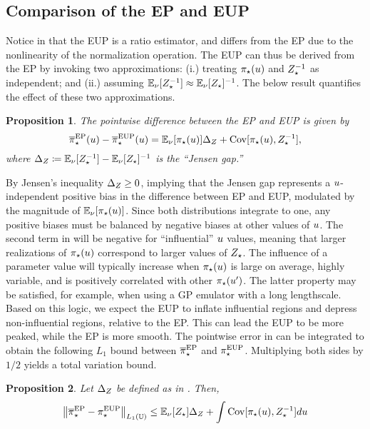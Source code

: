 \documentclass[12pt]{article}
\newtheorem{prop}{Proposition}
\begin{document}
\subsection{Comparison of the EP and EUP}
Notice in  that the EUP is a ratio estimator, and differs from 
the EP due to the nonlinearity of the normalization operation. The EUP can thus 
be derived from the EP by invoking two approximations: 
(i.) treating ${\pi}_{\star}(u)$ and ${Z}_{\star}^{-1}$ as independent; and 
(ii.) assuming $\mathbb{E}_{\nu}[{Z}_{\star}^{-1}] \approx \mathbb{E}_{\nu}[{Z}_{\star}]^{-1}$.
The below result quantifies the effect of these two approximations.

\begin{prop} \label{prop:ep-eup-pw-err}
The pointwise difference between the EP and EUP is given by
\begin{equation}
{\overline{\pi}}_{\star}^{\mathrm{EP}}(u) - {\overline{\pi}}_{\star}^{\mathrm{EUP}}(u)
= \mathbb{E}_{\nu}[{\pi}_{\star}(u)] \Delta_Z + \mathrm{Cov}[{\pi}_{\star}(u), {Z}_{\star}^{-1}],
\label{eq:ep-eup-pw-err}
\end{equation}
where $\Delta_Z \coloneqq \mathbb{E}_{\nu}[{Z}_{\star}^{-1}] - \mathbb{E}_{\nu}[{Z}_{\star}]^{-1}$
is the ``Jensen gap.''
\end{prop}

By Jensen's inequality $\Delta_Z \geq 0$, implying that the Jensen gap represents a 
$u$-independent positive bias in the difference between EP and EUP, modulated by the magnitude of 
$\mathbb{E}_{\nu}[{\pi}_{\star}(u)]$. Since both distributions integrate to one, any positive 
biases must be balanced by negative biases at other values of $u$.
The second term in  will be negative for ``influential'' $u$ values, 
meaning that larger realizations of ${\pi}_{\star}(u)$ correspond to larger values of 
${Z}_{\star}$. The influence of a parameter value will typically increase when 
${\pi}_{\star}(u)$ is large on average, highly variable, and is positively correlated with other 
${\pi}_{\star}(u^\prime)$. The latter property may be satisfied, for example, when using 
a GP emulator with a long lengthscale. Based on this logic, we expect the EUP to inflate 
influential regions and depress non-influential regions, relative to the EP. This can lead 
the EUP to be more peaked, while the EP is more smooth. The pointwise error in 
 can be integrated to obtain the following $L_1$ bound 
between ${\overline{\pi}}_{\star}^{\mathrm{EP}}$ and ${\pi}_{\star}^{\mathrm{EUP}}$. Multiplying both sides by $1/2$
yields a total variation bound.

\begin{prop} \label{prop:ep-eup-TV-err}
Let $\Delta_Z$ be defined as in . Then,
\begin{equation}
\left\lVert{\overline{\pi}}_{\star}^{\mathrm{EP}} - {\pi}_{\star}^{\mathrm{EUP}}\right\rVert_{L_1(\mathbb{U})}
\leq \mathbb{E}_{\nu}[{Z}_{\star}] \Delta_Z + \int \mathrm{Cov}[{\pi}_{\star}(u), {Z}_{\star}^{-1}] du
\label{eq:ep-eup-TV-err}
\end{equation}
\end{prop}
\end{document}
